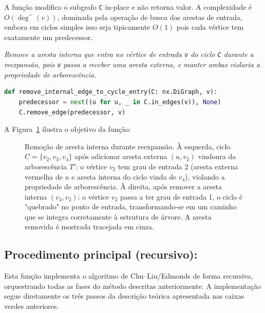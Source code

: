 A função modifica o subgrafo \texttt{C} in-place e não retorna valor. A complexidade é \(O(\deg^-(v))\), dominada pela operação de busca das arestas de entrada, embora em ciclos simples isso seja tipicamente \(O(1)\) pois cada vértice tem exatamente um predecessor.

\begin{tcolorbox}[
        enhanced, breakable,
        colframe=blue!60!black, colback=blue!2,
        colbacktitle=blue!15, coltitle=black,
        title={Remover arco interno na reexpansão},
        boxed title style={sharp corners, boxrule=0.6pt},
        sharp corners, boxrule=0.6pt
    ]
    \emph{Remove a aresta interna que entra no vértice de entrada \texttt{v} do ciclo \texttt{C} durante a reexpansão, pois \texttt{v} passa a receber uma aresta externa, e manter ambas violaria a propriedade de arborescência.}
    \tcblower
    \begin{lstlisting}[mathescape=true, language=Python]
def remove_internal_edge_to_cycle_entry(C: nx.DiGraph, v):
    predecessor = next((u for u, _ in C.in_edges(v)), None)
    C.remove_edge(predecessor, v) 
\end{lstlisting}
\end{tcolorbox}

A Figura~\ref{fig:remove-internal-edge-example} ilustra o objetivo da função:

\begin{figure}[H]
    \centering
    
    \caption{Remoção de aresta interna durante reexpansão. À esquerda, ciclo $C=\{v_2, v_3, v_4\}$ após adicionar aresta externa $(u, v_2)$ vindoura da arborescência $T'$: o vértice $v_2$ tem grau de entrada 2 (aresta externa vermelha de $u$ e aresta interna do ciclo vinda de $v_4$), violando a propriedade de arborescência. À direita, após remover a aresta interna $(v_4, v_2)$: o vértice $v_2$ passa a ter grau de entrada 1, o ciclo é "quebrado" no ponto de entrada, transformando-se em um caminho que se integra corretamente à estrutura de árvore. A aresta removida é mostrada tracejada em cinza.}
    \label{fig:remove-internal-edge-example}
\end{figure}

\subsection{Procedimento principal (recursivo):}
Esta função implementa o algoritmo de Chu–Liu/Edmonds de forma recursiva, orquestrando todas as fases do método descritas anteriormente. A implementação segue diretamente os três passos da descrição teórica apresentada nas caixas verdes anteriores.

